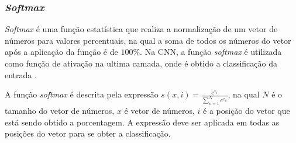 \subsubsection{\textit{Softmax}}
\textit{Softmax} é uma função estatística que realiza a normalização de um vetor de números para valores percentuais, na qual a soma de todos os números do vetor após a aplicação da função é de $100\%$. Na CNN, a função \textit{softmax} é utilizada como função de ativação na ultima camada, onde é obtido a classificação da entrada \cite{bishop2007pattern}. 
\par A função \textit{softmax} é descrita pela expressão $s(x,i)=\frac{e^{x_i}}{\sum_{n=1}^{N} e^{x_k}}$, na qual $N$ é o tamanho do vetor de números, $x$ é vetor de números, $i$ é a posição do vetor que está sendo obtido a porcentagem. A expressão deve ser aplicada em todas as posições do vetor para se obter a classificação.
